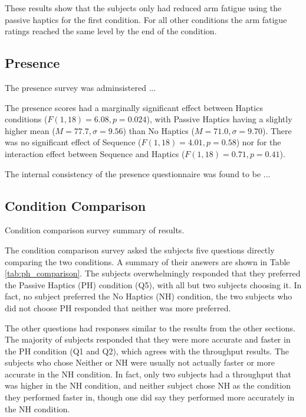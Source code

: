 These results show that the subjects only had reduced arm fatigue using the passive haptics for the first condition.
For all other conditions the arm fatigue ratings reached the same level by the end of the condition.

\subsection{Presence}

The presence survey was adminsistered ...

The presence scores had a marginally significant effect between Haptics conditions ($F(1,18)=6.08, p=0.024$), with Passive Haptics having a slightly higher mean ($M=77.7, \sigma=9.56$) than No Haptics ($M=71.0, \sigma=9.70$).
There was no significant effect of Sequence ($F(1,18)=4.01, p=0.58$) nor for the interaction effect between Sequence and Haptics ($F(1,18)=0.71, p=0.41$).

The internal consistency of the presence questionnaire was found to be ...

\subsection{Condition Comparison}

\begin{table}
    \centering
    \caption{Condition comparison survey summary of results.}
    \label{tab:ph_comparison}
\end{table}

The condition comparison survey asked the subjects five questions directly comparing the two conditions.
A summary of their answers are shown in Table \ref{tab:ph_comparison}.
The subjects overwhelmingly responded that they preferred the Passive Haptics (PH) condition (Q5), with all but two subjects choosing it.
In fact, no subject preferred the No Haptics (NH) condition, the two subjects who did not choose PH responded that neither was more preferred.

The other questions had responses similar to the results from the other sections.
The majority of subjects responded that they were more accurate and faster in the PH condition (Q1 and Q2), which agrees with the throughput results.
The subjects who chose Neither or NH were usually not actually faster or more accurate in the NH condition.
In fact, only two subjects had a throughput that was higher in the NH condition, and neither subject chose NH as the condition they performed faster in, though one did say they performed more accurately in the NH condition.

